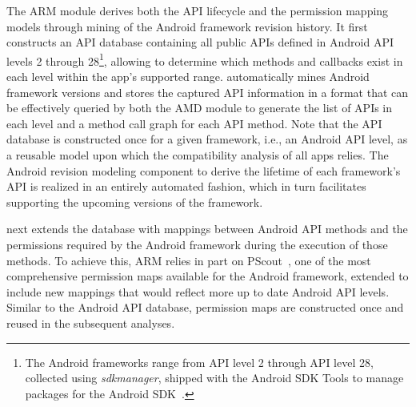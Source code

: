 The ARM module derives both the API lifecycle and the permission mapping models through mining of the Android framework revision history.
It first constructs an API database containing all public APIs defined in Android API levels 2 through 28\footnote{The Android frameworks range from API level 2 through API level 28, collected using {\it sdkmanager}, shipped with the Android SDK Tools to manage packages for the Android SDK~\cite{sdkmanager}. }, allowing \@approach to determine which methods and callbacks exist in each level within the app's supported range. \@approach automatically mines Android framework versions and stores the captured API information in a format that can be effectively queried by both the AMD module to generate the list of APIs in each level and a method call graph for each API method.
Note that the API database is constructed once for a given framework, i.e., an Android API level, as a reusable model upon which the compatibility analysis of all apps relies.
The Android revision modeling component to derive the lifetime of each framework's API is realized in an entirely automated fashion, which in turn facilitates supporting the upcoming versions of the framework. %



 \@approach next extends the database with mappings between Android API methods and the permissions required by the Android framework during the execution of those methods. To achieve this, ARM relies in part on PScout~\cite{au2012pscout}, one of the most comprehensive permission maps available for the Android framework,%
 extended to include new mappings that would reflect more up to date Android API levels. Similar to the Android API database, permission maps are constructed once and reused in the subsequent analyses.
 

  

\begin{figure}[t!]%
        
        \vspace{-0.6cm}
\end{figure}


